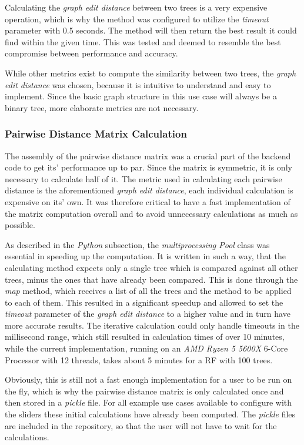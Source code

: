 \documentclass[a4paper, 12pt]{article}
\begin{document}
Calculating the \textit{graph edit distance} between two trees is a very expensive operation,
which is why the method was configured to utilize the \textit{timeout} parameter with 0.5 seconds.
The method will then return the best result it could find within the given time. This was tested
and deemed to resemble the best compromise between performance and accuracy.

While other metrics exist to compute the similarity between two trees, the \textit{graph edit
    distance} was chosen, because it is intuitive to understand and easy to implement. Since the
basic graph structure in this use case will always be a binary tree, more elaborate metrics
are not necessary.

\subsubsection{Pairwise Distance Matrix Calculation}
The assembly of the pairwise distance matrix was a crucial part of the backend code to get its'
performance up to par. Since the matrix is symmetric, it is only necessary to calculate half of
it. The metric used in calculating each pairwise distance is the aforementioned \textit{graph
    edit distance}, each individual calculation is expensive on its' own. It was therefore critical
to have a fast implementation of the matrix computation overall and to avoid unnecessary
calculations as much as possible. \par

As described in the \textit{Python} subsection, the \textit{multiprocessing Pool} class was
essential in speeding up the computation. It is written in such a way, that the calculating method
expects only a single tree which is compared against all other trees, minus the ones that
have already been compared. This is done through the \textit{map} method, which receives a list
of all the trees and the method to be applied to each of them. This resulted in a significant
speedup and allowed to set the \textit{timeout} parameter of the \textit{graph edit distance}
to a higher value and in turn have more accurate results. The iterative calculation could only
handle timeouts in the millisecond range, which still resulted in calculation times of over 10
minutes, while the current implementation, running on an \textit{AMD Ryzen 5 5600X} 6-Core
Processor with 12 threads, takes about 5 minutes for a RF with 100 trees. \par

Obviously, this is still not a fast enough implementation for a user to be run on the fly, which
is why the pairwise distance matrix is only calculated once and then stored in a \textit{pickle}
file. For all example use cases available to configure with the sliders these initial calculations
have already been computed. The \textit{pickle} files are included in the repository, so that the user
will not have to wait for the calculations. \par
\end{document}
